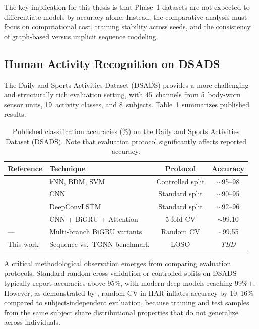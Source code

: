 \documentclass[11pt,a4paper]{article}
\begin{document}
The key implication for this thesis is that Phase~1 datasets are not expected to differentiate models by accuracy alone. Instead, the comparative analysis must focus on computational cost, training stability across seeds, and the consistency of graph-based versus implicit sequence modeling.

\subsection{Human Activity Recognition on DSADS}

The Daily and Sports Activities Dataset (DSADS) \citep{uci_dsa,altun2010har} provides a more challenging and structurally rich evaluation setting, with 45~channels from 5~body-worn sensor units, 19~activity classes, and 8~subjects. Table~\ref{tab:lit_dsads} summarizes published results.

\begin{table}[htbp]
\centering
\caption{Published classification accuracies (\%) on the Daily and Sports Activities Dataset (DSADS). Note that evaluation protocol significantly affects reported accuracy.}
\label{tab:lit_dsads}
\small
\begin{tabular}{@{}llcc@{}}
\toprule
\textbf{Reference} & \textbf{Technique} & \textbf{Protocol} & \textbf{Accuracy} \\
\midrule
\citet{altun2010har} & kNN, BDM, SVM & Controlled split & $\sim$95--98 \\
\citet{zeng2014cnn} & CNN & Standard split & $\sim$90--95 \\
\citet{ordonez2016deep} & DeepConvLSTM & Standard split & $\sim$92--96 \\
\citet{wang2024cnnbigru} & CNN + BiGRU + Attention & 5-fold CV & $\sim$99.10 \\
--- & Multi-branch BiGRU variants & Random CV & $\sim$99.55 \\
\midrule
This work & Sequence vs.\ TGNN benchmark & LOSO & \textit{TBD} \\
\bottomrule
\end{tabular}
\end{table}

A critical methodological observation emerges from comparing evaluation protocols. Standard random cross-validation or controlled splits on DSADS typically report accuracies above 95\%, with modern deep models reaching 99\%+. However, as demonstrated by \citet{huynh2005evaluation}, random CV in HAR inflates accuracy by 10--16\% compared to subject-independent evaluation, because training and test samples from the same subject share distributional properties that do not generalize across individuals.
\end{document}
